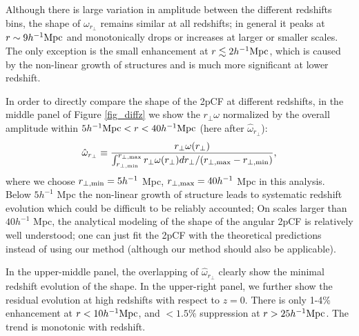 \documentclass[iop]{emulateapj}
\begin{document}
Although there is large variation in amplitude between the different redshifts bins, 
the shape of $\omega_{r_{\perp}}$  remains similar at all redshifts;
in general it peaks at $r\sim9 h^{-1}\rm Mpc$ and monotonically drops or increases at larger or smaller scales.
The only exception is the small enhancement at $r\lesssim 2 h^{-1}\rm Mpc$,
which is caused by the non-linear growth of structures 
and is much more significant at lower redshift.

In order to directly compare the shape of the 2pCF at different redshifts,
in the middle panel of Figure \ref{fig_diffz} 
we show the $r_\perp\omega$ normalized by the overall amplitude within 
$5h^{-1}{\rm Mpc} < r < 40h^{-1}{\rm Mpc}$
(here after $\hat \omega_{r_\perp}$):
\begin{equation}
 \hat \omega_{ r_\perp} \equiv  \frac{ {r_\perp\omega}(r_{\perp})}{ \int_{r_{\perp, \rm min}}^{r_{\perp, \rm max}}r_{\perp} \omega(r_{\perp}) d r_{\perp} / (r_{\perp,\rm max}-r_{\perp,\rm min}) },
\end{equation}
where we choose $r_{\perp, \rm min}=5 h^{-1}$ Mpc, $r_{\perp, \rm max}=40 h^{-1}$ Mpc in this analysis.
Below $5 h^{-1}$ Mpc the non-linear growth of structure 
leads to systematic redshift evolution which could be difficult to be reliably accounted;
On scales larger than $40 h^{-1}$ Mpc,
the analytical modeling of the shape of the angular 2pCF is relatively well understood;
one can just fit the 2pCF with the theoretical predictions \citep{BCGS2001,Salvador2014,Salvador2016} 
instead of using our method 
(although our method should also be applicable).

In the upper-middle panel, the overlapping of $\hat\omega_{r_{\perp}}$
clearly show the minimal redshift evolution of the shape.
In the upper-right panel, 
we further show the residual evolution at high redshifts 
with respect to $z=0$.
There is only 1-4\% enhancement 
at $r<10h^{-1}\rm Mpc$,
and $<1.5\%$ suppression at $r>25 h^{-1}\rm Mpc$.
The trend is monotonic with redshift.
\end{document}
